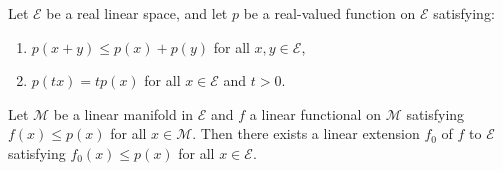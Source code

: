 Let $\mathcal{E}$ be a real linear space, and let $p$ be a real-valued function on $\mathcal{E}$ satisfying:
\begin{enumerate}
\item[(i)] $p(x + y) \leq p(x) + p(y)$ for all $x, y \in \mathcal{E}$,
\item[(ii)] $p(tx) = tp(x)$ for all $x \in \mathcal{E}$ and $t > 0$.
\end{enumerate}
Let $\mathcal{M}$ be a linear manifold in $\mathcal{E}$ and $f$ a linear functional on $\mathcal{M}$ satisfying $f(x) \leq p(x)$ for all $x \in \mathcal{M}$. Then there exists a linear extension $f_0$ of $f$ to $\mathcal{E}$ satisfying $f_0(x) \leq p(x)$ for all $x \in \mathcal{E}$.
